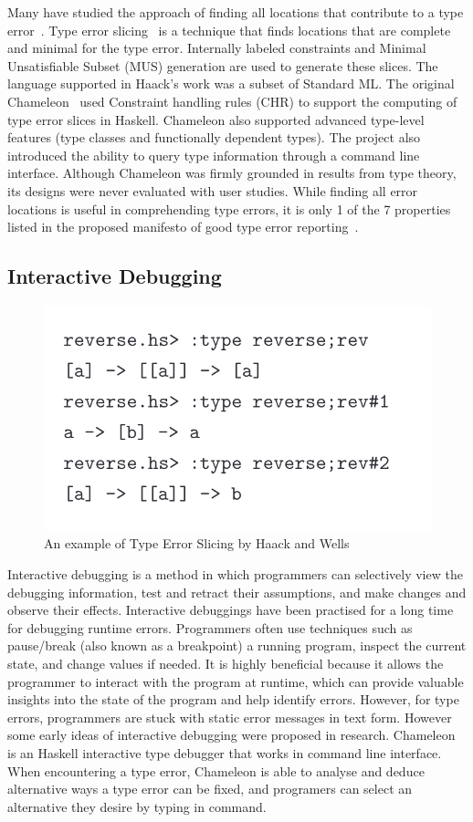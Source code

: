 Many have studied the approach of finding all locations that contribute to a type error~\cite{Stuckey2003-pz, Haack2004-fr, Pavlinovic2015-ke, Schilling2012-iq}. Type error slicing~\cite{Haack2004-fr} is a technique that finds locations that are complete and minimal for the type error. Internally labeled constraints and Minimal Unsatisfiable Subset (MUS) generation are used to generate these slices. The language supported in Haack's work was a subset of Standard ML. The original Chameleon~\cite{Stuckey2003-pz} used  Constraint handling rules (CHR) to support the computing of type error slices in Haskell. Chameleon also supported advanced type-level features (type classes and functionally dependent types). The project also introduced the ability to query type information through a command line interface. Although Chameleon was firmly grounded in results from type theory, its designs were never evaluated with user studies. While finding all error locations is useful in comprehending type errors, it is only 1 of the 7 properties listed in the proposed manifesto of good type error reporting~\cite{Yang2000-wn}.

\subsection{Interactive Debugging}

\begin{figure}[hbt]
    \includegraphics[width=0.6\linewidth]{ChameleonInteractive}
    \caption{An example of Type Error Slicing by Haack and Wells
    }
\end{figure}
Interactive debugging is a method in which programmers can selectively view the debugging information, test and retract their assumptions, and  make changes and observe their effects. Interactive debuggings have been practised for a long time for debugging runtime errors. Programmers often use techniques such as pause/break (also known as a breakpoint) a running program, inspect the current state, and change values if needed. It is highly beneficial because it allows the programmer to interact with the program at runtime, which can provide valuable insights into the state of the program and help identify errors. However, for type errors, programmers are stuck with static error messages in text form. However some early ideas of interactive debugging were proposed in research. Chameleon is an Haskell interactive type debugger that works in command line interface. When encountering a type error, Chameleon is able to analyse and deduce alternative ways a type error can be fixed, and programers can select an alternative they desire by typing in command.


